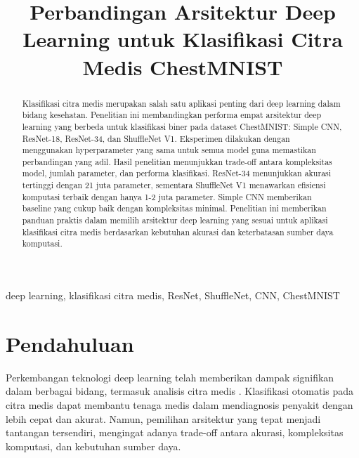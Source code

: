 \documentclass[conference]{IEEEtran}
\begin{document}
\title{Perbandingan Arsitektur Deep Learning untuk Klasifikasi Citra Medis ChestMNIST\\
{\footnotesize \textsuperscript{}}
}

\author{
}

\maketitle

\begin{abstract}
Klasifikasi citra medis merupakan salah satu aplikasi penting dari deep learning dalam bidang kesehatan. Penelitian ini membandingkan performa empat arsitektur deep learning yang berbeda untuk klasifikasi biner pada dataset ChestMNIST: Simple CNN, ResNet-18, ResNet-34, dan ShuffleNet V1. Eksperimen dilakukan dengan menggunakan hyperparameter yang sama untuk semua model guna memastikan perbandingan yang adil. Hasil penelitian menunjukkan trade-off antara kompleksitas model, jumlah parameter, dan performa klasifikasi. ResNet-34 menunjukkan akurasi tertinggi dengan 21 juta parameter, sementara ShuffleNet V1 menawarkan efisiensi komputasi terbaik dengan hanya 1-2 juta parameter. Simple CNN memberikan baseline yang cukup baik dengan kompleksitas minimal. Penelitian ini memberikan panduan praktis dalam memilih arsitektur deep learning yang sesuai untuk aplikasi klasifikasi citra medis berdasarkan kebutuhan akurasi dan keterbatasan sumber daya komputasi.
\end{abstract}

\begin{IEEEkeywords}
deep learning, klasifikasi citra medis, ResNet, ShuffleNet, CNN, ChestMNIST
\end{IEEEkeywords}

\section{Pendahuluan}
Perkembangan teknologi deep learning telah memberikan dampak signifikan dalam berbagai bidang, termasuk analisis citra medis \cite{litjens2017survey}. Klasifikasi otomatis pada citra medis dapat membantu tenaga medis dalam mendiagnosis penyakit dengan lebih cepat dan akurat. Namun, pemilihan arsitektur yang tepat menjadi tantangan tersendiri, mengingat adanya trade-off antara akurasi, kompleksitas komputasi, dan kebutuhan sumber daya.
\end{document}

